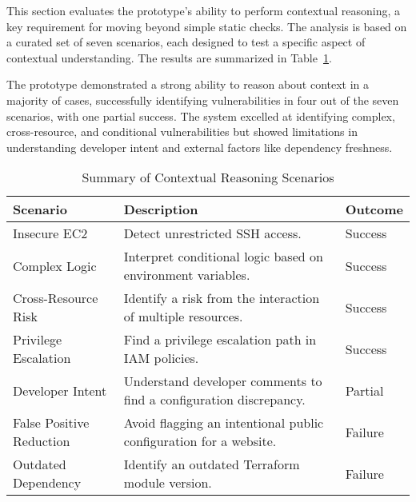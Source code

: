 This section evaluates the prototype's ability to perform contextual reasoning, a key requirement for moving beyond simple static checks. The analysis is based on a curated set of seven scenarios, each designed to test a specific aspect of contextual understanding. The results are summarized in Table~\ref{tab:context-reasoning-summary}.

The prototype demonstrated a strong ability to reason about context in a majority of cases, successfully identifying vulnerabilities in four out of the seven scenarios, with one partial success. The system excelled at identifying complex, cross-resource, and conditional vulnerabilities but showed limitations in understanding developer intent and external factors like dependency freshness.

\begin{table}[htbp]
	\centering
	\caption{Summary of Contextual Reasoning Scenarios}\label{tab:context-reasoning-summary}
	\begin{tabular}{p{}p{}l}
		\hline
		\textbf{Scenario} & \textbf{Description} & \textbf{Outcome} \\
		\hline
		Insecure EC2 & Detect unrestricted SSH access. & Success \\
		Complex Logic & Interpret conditional logic based on environment variables. & Success \\
		Cross-Resource Risk & Identify a risk from the interaction of multiple resources. & Success \\
		Privilege Escalation & Find a privilege escalation path in IAM policies. & Success \\
		Developer Intent & Understand developer comments to find a configuration discrepancy. & Partial \\
		False Positive Reduction & Avoid flagging an intentional public configuration for a website. & Failure \\
		Outdated Dependency & Identify an outdated Terraform module version. & Failure \\
		\hline
	\end{tabular}
\end{table}

